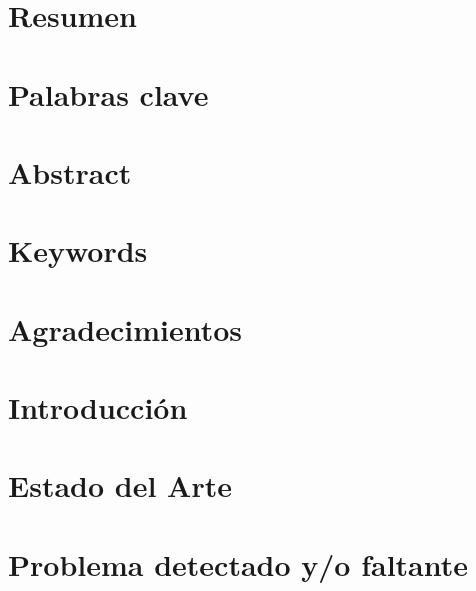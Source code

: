 \documentclass[11pt]{article}
\begin{document}
\restoregeometry

\thispagestyle{empty}

\newpage
\thispagestyle{empty}
\tableofcontents
\thispagestyle{empty}
\newpage

\setcounter{page}{1} %

\section{Resumen}



\section{Palabras clave}



\newpage

\section{Abstract}



\section{Keywords}



\newpage

\section{Agradecimientos}



\newpage

\section{Introducción}



\section{Estado del Arte}



\section{Problema detectado y/o faltante}
\end{document}
